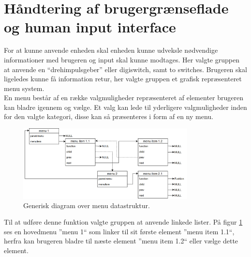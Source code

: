 \section{Håndtering af brugergrænseflade og human input interface}
\label{sec:HID}
For at kunne anvende enheden skal enheden kunne udveksle nødvendige informationer med brugeren og input skal kunne modtages.
Her valgte gruppen at anvende en ``drehimpulsgeber'' eller digiswitch, samt to switches.
Brugeren skal ligeledes kunne få information retur, her valgte gruppen et grafisk repræsenteret menu system.
\\
En menu består af en række valgmuligheder repræsenteret af elementer brugeren kan bladre igennem og vælge.
Et valg kan lede til yderligere valgmuligheder inden for den valgte kategori, disse kan så præsenteres i form af en ny menu.
\begin{figure}[!ht]
	\centering 
	\includegraphics[width=0.8\textwidth]{billeder/menuesdiagram.png} 
	\caption{Generisk diagram over menu datastruktur. } 
	\label{fig:menuesdiagram} 
\end{figure}
Til at udføre denne funktion valgte gruppen at anvende linkede lister.\newline
På figur \ref{fig:menuesdiagram} ses en hovedmenu ''menu 1`` som linker til sit første element ''menu item 1.1``, herfra kan brugeren bladre til næste element ''menu item 1.2`` eller vælge dette element.
